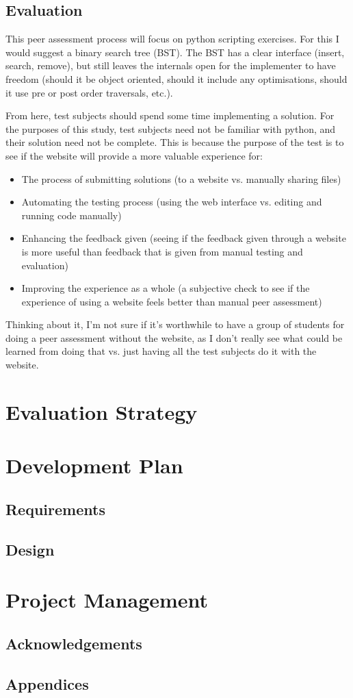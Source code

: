 \documentclass[a4paper,11pt]{report}
\begin{document}
\section{Evaluation}
This peer assessment process will focus on python scripting exercises. For this I would suggest a binary search tree (BST). The BST has a clear interface (insert, search, remove), but still leaves the internals open for the implementer to have freedom (should it be object oriented, should it include any optimisations, should it use pre or post order traversals, etc.).\par
From here, test subjects should spend some time implementing a solution. For the purposes of this study, test subjects need not be familiar with python, and their solution need not be complete. This is because the purpose of the test is to see if the website will provide a more valuable experience for:
\begin{itemize}
 \item The process of submitting solutions (to a website vs. manually sharing files)
 \item Automating the testing process (using the web interface vs. editing and running code manually)
 \item Enhancing the feedback given (seeing if the feedback given through a website is more useful than feedback that is given from manual testing and evaluation)
 \item Improving the experience as a whole (a subjective check to see if the experience of using a website feels better than manual peer assessment)
\end{itemize}
Thinking about it, I'm not sure if it's worthwhile to have a group of students for doing a peer assessment without the website, as I don't really see what could be learned from doing that vs. just having all the test subjects do it with the website.


\chapter{Evaluation Strategy}

\chapter{Development Plan}

\section{Requirements}

\section{Design}


\chapter{Project Management}

{}


\section*{Acknowledgements}

\section*{Appendices}
\end{document}
